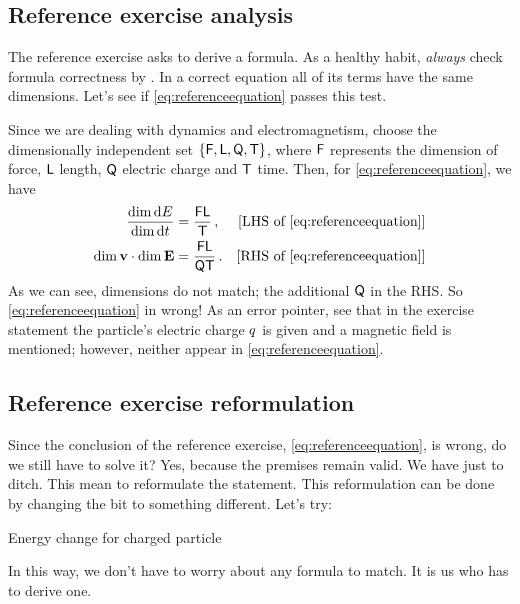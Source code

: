 \subsection{Reference exercise analysis}
%
The reference exercise asks to derive a formula. As a healthy habit, \emph{always} check formula correctness by  .
%
%
In a correct equation all of its terms have the same dimensions. Let's see if \cref{eq:referenceequation} passes this test.

Since we are dealing with dynamics and electromagnetism, choose the dimensionally independent set $\lbrace{\mathsf{F}, \mathsf{L}, \mathsf{Q}, \mathsf{T}}\rbrace$, where $\mathsf{F}$ represents the dimension of force, $\mathsf{L}$ length, $\mathsf{Q}$ electric charge and $\mathsf{T}$ time. Then, for \cref{eq:referenceequation}, we have
%
\begin{align*}
%
  \dfrac{\dim\dx E}{\dim\dx t} &= \dfrac{\phdim{FL}}{\phdim{T}}\,, & \eqtxt{LHS of \cref{eq:referenceequation}} \\
  \dim{\mathbf{v}}\iprod\dim{\mathbf{E}} &= \dfrac{\phdim{FL}}{\phdim{QT}}\,. & \eqtxt{RHS of \cref{eq:referenceequation}}
%
\end{align*}
%
As we can see, dimensions do not match; \viz the additional $\mathsf{Q}$ in the RHS. So \cref{eq:referenceequation} in wrong! As an error pointer, see that in the exercise statement the particle's electric charge $q$ is given and a magnetic field is mentioned; however, neither appear in \cref{eq:referenceequation}.


\subsection{Reference exercise reformulation}
%
Since the conclusion of the reference exercise, \cref{eq:referenceequation}, is wrong, do we still have to solve it? Yes, because the premises remain valid. We have just to ditch. This mean to reformulate the statement. This reformulation can be done by changing the  bit to something different. Let's try:
%
\begin{description}
%
\item[Energy change for charged particle] 
%
\end{description}
%
In this way, we don't have to worry about any formula to match. It is us who has to derive one.


